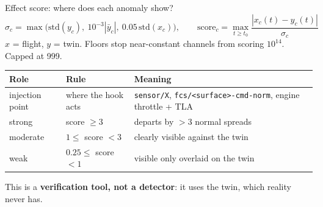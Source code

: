 \documentclass[aspectratio=169,11pt]{beamer}
\newcommand{\aside}[1]{{\color{muted}\small #1}}
\begin{document}
\begin{frame}{Effect score: where does each anomaly show?}
  \small
  \[
    \sigma_c = \max\big(\mathrm{std}(y_c),\ 10^{-3}|\bar y_c|,\ 0.05\,\mathrm{std}(x_c)\big),\qquad
    \mathrm{score}_c = \max_{t\ge t_0}\frac{|x_c(t)-y_c(t)|}{\sigma_c}
  \]
  \aside{$x$ = flight, $y$ = twin. Floors stop near-constant channels from scoring $10^{14}$. Capped at 999.}
  \vspace{0.6em}

  \begin{tabularx}{\textwidth}{@{}l l L@{}}
    \toprule
    Role & Rule & Meaning \\
    \midrule
    injection point & where the hook acts & \texttt{sensor/X}, \texttt{fcs/<surface>-cmd-norm}, engine throttle + TLA \\
    strong & score $\ge 3$ & departs by $>$3 normal spreads \\
    moderate & $1 \le$ score $< 3$ & clearly visible against the twin \\
    weak & $0.25 \le$ score $< 1$ & visible only overlaid on the twin \\
    \bottomrule
  \end{tabularx}
  \vspace{0.8em}
  \begin{block}{}
    \small This is a \textbf{verification tool, not a detector}: it uses the twin, which reality never has.
  \end{block}
\end{frame}
\end{document}
